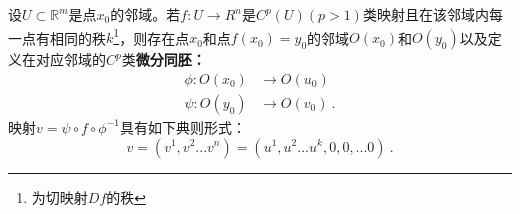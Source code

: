 

\begin{issues}
\issueDraft
\end{issues}

\begin{theorem}{}
设$U\subset \mathbb R^m$是点$x_0$的邻域。若$f:U\rightarrow R^n$是$ C^p(U)(p>1)$类映射且在该邻域内每一点有相同的秩$k$\footnote{为切映射$Df$的秩}，则存在点$x_0$和点$f(x_0)=y_0$的邻域$O(x_0)$和$O(y_0)$以及定义在对应邻域的$C^p$类\textbf{微分同胚：}
\begin{equation}
\begin{aligned}
\phi:O(x_0) &\rightarrow O(u_0)\\
\psi:O(y_0) &\rightarrow O(v_0)~.
\end{aligned}
\end{equation}
映射$v=\psi\circ f\circ \phi^{-1}$具有如下典则形式：
\begin{equation}
v=(v^1,v^2...v^n)=(u^1,u^2...u^k,0,0,...0)~.
\end{equation}
\end{theorem}
